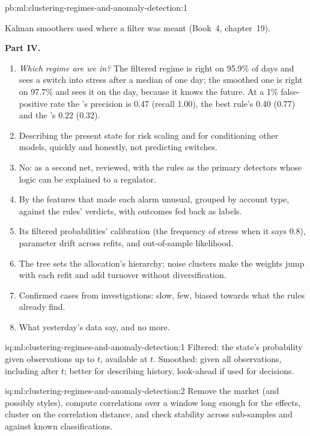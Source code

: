 \begin{solution}{pb:ml:clustering-regimes-and-anomaly-detection:1}
\begin{enumerate}[resume]
Kalman smoothers used where a filter was meant (Book~4, chapter~19).
\end{enumerate}
\textbf{Part IV.}
\begin{enumerate}[resume]
\item \emph{Which regime are we in?} The filtered regime is right on 95.9\% of days and sees a switch into stress after a median
of one day; the smoothed one is right on 97.7\% and sees it on the day, because it knows the future. At a 1\% false-positive
rate the 's precision is 0.47 (recall 1.00), the best rule's 0.40 (0.77) and the 's 0.22 (0.32).
\item Describing the present state for risk scaling and for conditioning other models, quickly and honestly, not predicting
switches.
\item No: as a second net, reviewed, with the rules as the primary detectors whose logic can be explained to a regulator.
\item By the features that made each alarm unusual, grouped by account type, against the rules' verdicts, with outcomes fed
back as labels.
\item Its filtered probabilities' calibration (the frequency of stress when it says 0.8), parameter drift across refits, and
out-of-sample likelihood.
\item The tree sets the allocation's hierarchy; noise clusters make the weights jump with each refit and add turnover without
diversification.
\item Confirmed cases from investigations: slow, few, biased towards what the rules already find.
\item What yesterday's data say, and no more.
\end{enumerate}
\end{solution}

\begin{solution}{iq:ml:clustering-regimes-and-anomaly-detection:1}
Filtered: the state's probability given observations up to $t$, available at $t$. Smoothed: given all observations, including
after $t$; better for describing history, look-ahead if used for decisions.
\end{solution}

\begin{solution}{iq:ml:clustering-regimes-and-anomaly-detection:2}
Remove the market (and possibly styles), compute correlations over a window long enough for the effects, cluster on the
correlation distance, and check stability across sub-samples and against known classifications.
\end{solution}

